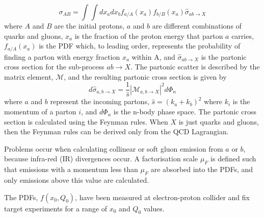\begin{equation}
\sigma_{AB}=\int\int dx_a dx_b f_{a/A}(x_a) f_{b/B}(x_a) \hat{\sigma}_{ab\rightarrow X}
\label{Theory:XSec}
\end{equation}
where $A$ and $B$ are the initial protons, $a$ and $b$ are different combinations of quarks and gluons, $x_a$ is the fraction of the proton energy that parton $a$ carries, $ f_{a/A}(x_a)$ is the PDF which, to leading order, represents the probability of finding a parton with energy fraction  $x_a$ within A, and $\hat{\sigma}_{ab\rightarrow X}$ is the partonic cross section for the sub-process $ab\rightarrow X$.
The partonic scatter is described by the matrix element, $\mathcal{M}$, and the resulting partonic cross section is given by
\begin{equation}
d \hat{\sigma}_{a,b\rightarrow X}= \frac{1}{\hat{s}}|\mathcal{M}_{a,b\rightarrow X}|^{2} d\Phi_n
\label{Theory:PartonCrossSection}
\end{equation}
where $a$ and $b$ represent the incoming partons, $\hat{s}= (k_a + k_b)^2$ where $k_i$ is the momentum of a parton $i$, and $d\Phi_n$ is the n-body phase space.
The partonic cross section is calculated using the Feynman rules.
When $X$ is just quarks and gluons, then the Feynman rules can be derived only from the QCD Lagrangian. 

Problems occur when calculating collinear or soft gluon emission from $a$ or $b$, because infra-red (IR) divergences occur.  
A factorisation scale $\mu_F$ is defined such that emissions with a momentum less than $\mu_F$ are absorbed into the PDFs, and only emissions above this value are calculated. 



The PDFs, $f(x_0,Q_0)$, have been measured at electron-proton collider and fix target experiments for a range of $x_0$ and $Q_0$ values. 

